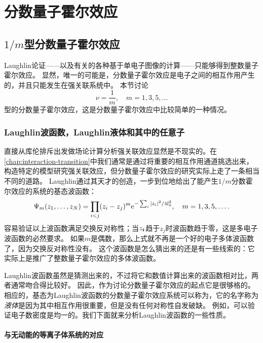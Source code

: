 \chapter{分数量子霍尔效应}

\section{$1/m$型分数量子霍尔效应}

Laughlin论证——以及有关的各种基于单电子图像的计算——只能够得到整数量子霍尔效应。
显然，唯一的可能是，分数量子霍尔效应是电子之间的相互作用产生的，并且只能发生在强关联系统中。
本节讨论
\[
    \nu = \frac{1}{m}, \quad m = 1, 3, 5, \ldots
\]
型的分数量子霍尔效应，这是分数量子霍尔效应中比较简单的一种情况。

\subsection{Laughlin波函数，Laughlin液体和其中的任意子}

直接从库伦排斥出发做场论计算分析强关联效应显然是不现实的。在\autoref{chap:interaction-transition}中我们通常是通过将重要的相互作用通道挑选出来，构造特定的模型研究强关联效应，但分数量子霍尔效应的研究实际上走了一条相当不同的道路。
Laughlin通过其天才的创造，一步到位地给出了能产生$1/m$分数霍尔效应的系统的基态波函数：
\begin{equation}
    \Psi_m(z_1, \ldots, z_{N}) = \prod_{i < j} (z_i - z_j)^{m} \mathrm{e}^{- \sum_{{i}} \abs*{z_{{i}}}^2 / 4 l_0^2}, \quad m = 1, 3, 5, \ldots.
    \label{eq:laughlin-wavefunction-m}
\end{equation}
容易验证以上波函数满足交换反对称性；当$z_{\vb*{i}}$趋于$z_j$时波函数趋于零，这是多电子波函数的必然要求。
如果$m$是偶数，那么上式就不再是一个好的电子多体波函数了，因为交换反对称性没有。
这个波函数是怎么猜出来的还是有一些线索的：它实际上是推广了整数量子霍尔效应的多体波函数。

Laughlin波函数虽然是猜测出来的，不过将它和数值计算出来的波函数相对比，两者通常吻合得比较好。
因此，作为讨论分数量子霍尔效应的起点它是很够格的。相应的，基态为Laughlin波函数的分数量子霍尔效应系统可以称为，它的名字称为\emph{液体}是因为其中相互作用很重要，但是没有任何对称性自发破缺。
例如，可以验证电子数密度是均一的。我们下面就来分析Laughlin波函数的一些性质。

\subsubsection{与无动能的等离子体系统的对应}

